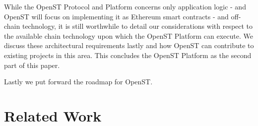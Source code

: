 \documentclass[12pt,a4paper, twocolumn]{article}
\begin{document}
While the OpenST Protocol and Platform concerns only application logic - and OpenST will focus on implementing it as Ethereum smart contracts - and off-chain technology, it is still worthwhile to detail our considerations with respect to the available chain technology upon which the OpenST Platform can execute.  We discuss these architectural requirements lastly and how OpenST can contribute to existing projects in this area. This concludes the OpenST Platform as the second part of this paper.\par
Lastly we put forward the roadmap for OpenST.\par

\section{Related Work}
\end{document}
